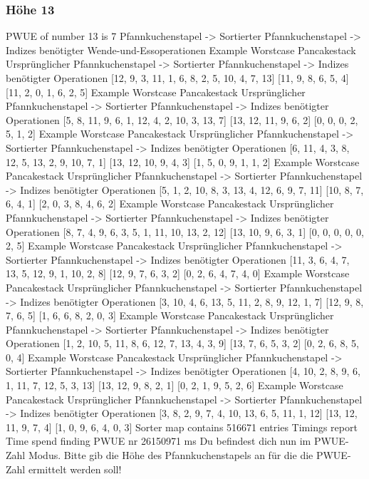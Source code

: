 {\subsubsection{Höhe 13}
    PWUE of number 13 is 7
    Pfannkuchenstapel -> Sortierter Pfannkuchenstapel -> Indizes benötigter Wende-und-Essoperationen
    Example Worstcase Pancakestack
    Ursprünglicher Pfannkuchenstapel -> Sortierter Pfannkuchenstapel -> Indizes benötigter Operationen
    [12, 9, 3, 11, 1, 6, 8, 2, 5, 10, 4, 7, 13]
    [11, 9, 8, 6, 5, 4]
    [11, 2, 0, 1, 6, 2, 5]
    Example Worstcase Pancakestack
    Ursprünglicher Pfannkuchenstapel -> Sortierter Pfannkuchenstapel -> Indizes benötigter Operationen
    [5, 8, 11, 9, 6, 1, 12, 4, 2, 10, 3, 13, 7]
    [13, 12, 11, 9, 6, 2]
    [0, 0, 0, 2, 5, 1, 2]
    Example Worstcase Pancakestack
    Ursprünglicher Pfannkuchenstapel -> Sortierter Pfannkuchenstapel -> Indizes benötigter Operationen
    [6, 11, 4, 3, 8, 12, 5, 13, 2, 9, 10, 7, 1]
    [13, 12, 10, 9, 4, 3]
    [1, 5, 0, 9, 1, 1, 2]
    Example Worstcase Pancakestack
    Ursprünglicher Pfannkuchenstapel -> Sortierter Pfannkuchenstapel -> Indizes benötigter Operationen
    [5, 1, 2, 10, 8, 3, 13, 4, 12, 6, 9, 7, 11]
    [10, 8, 7, 6, 4, 1]
    [2, 0, 3, 8, 4, 6, 2]
    Example Worstcase Pancakestack
    Ursprünglicher Pfannkuchenstapel -> Sortierter Pfannkuchenstapel -> Indizes benötigter Operationen
    [8, 7, 4, 9, 6, 3, 5, 1, 11, 10, 13, 2, 12]
    [13, 10, 9, 6, 3, 1]
    [0, 0, 0, 0, 0, 2, 5]
    Example Worstcase Pancakestack
    Ursprünglicher Pfannkuchenstapel -> Sortierter Pfannkuchenstapel -> Indizes benötigter Operationen
    [11, 3, 6, 4, 7, 13, 5, 12, 9, 1, 10, 2, 8]
    [12, 9, 7, 6, 3, 2]
    [0, 2, 6, 4, 7, 4, 0]
    Example Worstcase Pancakestack
    Ursprünglicher Pfannkuchenstapel -> Sortierter Pfannkuchenstapel -> Indizes benötigter Operationen
    [3, 10, 4, 6, 13, 5, 11, 2, 8, 9, 12, 1, 7]
    [12, 9, 8, 7, 6, 5]
    [1, 6, 6, 8, 2, 0, 3]
    Example Worstcase Pancakestack
    Ursprünglicher Pfannkuchenstapel -> Sortierter Pfannkuchenstapel -> Indizes benötigter Operationen
    [1, 2, 10, 5, 11, 8, 6, 12, 7, 13, 4, 3, 9]
    [13, 7, 6, 5, 3, 2]
    [0, 2, 6, 8, 5, 0, 4]
    Example Worstcase Pancakestack
    Ursprünglicher Pfannkuchenstapel -> Sortierter Pfannkuchenstapel -> Indizes benötigter Operationen
    [4, 10, 2, 8, 9, 6, 1, 11, 7, 12, 5, 3, 13]
    [13, 12, 9, 8, 2, 1]
    [0, 2, 1, 9, 5, 2, 6]
    Example Worstcase Pancakestack
    Ursprünglicher Pfannkuchenstapel -> Sortierter Pfannkuchenstapel -> Indizes benötigter Operationen
    [3, 8, 2, 9, 7, 4, 10, 13, 6, 5, 11, 1, 12]
    [13, 12, 11, 9, 7, 4]
    [1, 0, 9, 6, 4, 0, 3]
    Sorter map contains 516671 entries
    Timings report
    Time spend finding PWUE nr 26150971 ms
    Du befindest dich nun im PWUE-Zahl Modus.
    Bitte gib die Höhe des Pfannkuchenstapels an für die die PWUE-Zahl ermittelt werden soll!
}


